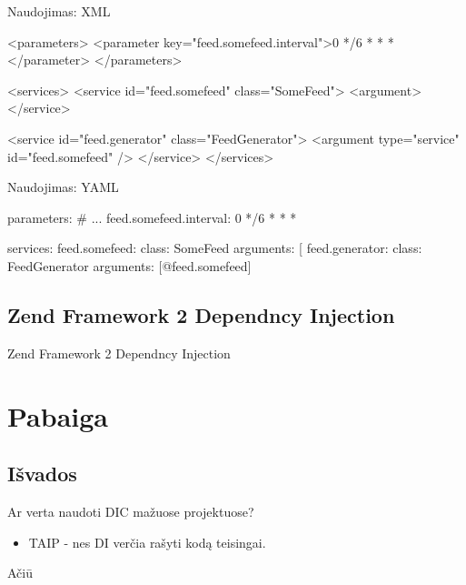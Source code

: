 \documentclass[12pt,a4paper]{beamer}
\begin{document}
\begin{frame}[fragile]{Naudojimas: XML}
\begin{xmlcode}
    <parameters>
        <parameter key="feed.somefeed.interval">0 */6 * * *</parameter>
    </parameters>

    <services>
        <service id="feed.somefeed" class="SomeFeed">
            <argument>%
        </service>

        <service id="feed.generator" class="FeedGenerator">
            <argument type="service" id="feed.somefeed" />
        </service>
    </services>
\end{xmlcode}
\end{frame}

\begin{frame}[fragile]{Naudojimas: YAML}
\begin{yamlcode}
    parameters:
        # ...
        feed.somefeed.interval: 0 */6 * * *

    services:
        feed.somefeed:
            class:     SomeFeed 
            arguments: [%
        feed.generator:
            class:     FeedGenerator
            arguments: [@feed.somefeed]
\end{yamlcode}
\end{frame}

\subsection{Zend Framework 2 Dependncy Injection}
\begin{frame}
	\begin{center}
        {\Huge Zend Framework 2 Dependncy Injection}
	\end{center}
\end{frame}

\section{Pabaiga}

\subsection{Išvados}
\begin{frame}{Ar verta naudoti DIC mažuose projektuose?}
    \begin{itemize}
        \item TAIP - nes DI verčia rašyti kodą teisingai.
    \end{itemize}
\end{frame}
\begin{frame}
	\begin{center}
        {\Huge Ačiū}
	\end{center}
\end{frame}
\end{document}
